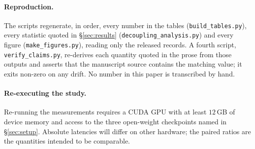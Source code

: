 \documentclass[sigplan,10pt,anonymous,review,nonacm]{acmart}
\begin{document}
\paragraph{Reproduction.} The scripts regenerate, in order, every number in
the tables (\texttt{build\_\allowbreak tables.py}), every statistic quoted in
\S\ref{sec:results} (\texttt{decoupling\_\allowbreak analysis.py}) and every
figure (\texttt{make\_\allowbreak figures.py}), reading only the released
records. A fourth script, \texttt{verify\_\allowbreak claims.py}, re-derives
each quantity quoted in the
prose from those outputs and asserts that the manuscript source contains the
matching value; it exits non-zero on any drift. No number in this paper is
transcribed by hand.

\paragraph{Re-executing the study.} Re-running the measurements requires a
CUDA GPU with at least $12$\,GB of device memory and access to the three
open-weight checkpoints named in \S\ref{sec:setup}. Absolute latencies will
differ on other hardware; the paired ratios are the quantities intended to be
comparable.

\end{document}

